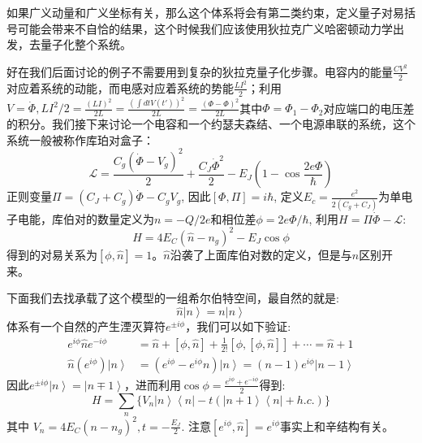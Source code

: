 \documentclass[supercite]{HustGraduPaper}
\newcommand{\bra}[1]{\left\langle #1 \right|}
\newcommand{\ket}[1]{\left| #1 \right\rangle}
\begin{document}
   	如果广义动量和广义坐标有关，那么这个体系将会有第二类约束，定义量子对易括号可能会带来不自恰的结果，这个时候我们应该使用狄拉克广义哈密顿动力学出发，去量子化整个系统。
   	
   	好在我们后面讨论的例子不需要用到复杂的狄拉克量子化步骤。电容内的能量$\frac{CV^2}{2}$对应着系统的动能，而电感对应着系统的势能$\frac{LI^2}{2}$；利用$V = \dot{\Phi}, LI^2/2 = \frac{(LI)^2}{2L} = \frac{(\int dt V(t'))^2}{2L} = \frac{(\Phi - \Phi)^2}{2L}$其中$\Phi = \Phi_1 - \Phi_2$对应端口的电压差的积分。我们接下来讨论一个电容和一个约瑟夫森结、一个电源串联的系统，这个系统一般被称作库珀对盒子：
   	\begin{equation}
   	\mathcal{L} = \frac{C_g (\dot \Phi - V_g)^2}{2} + \frac{C_J \dot \Phi^2}{2} - E_J(1-\cos\frac{2e\Phi}{\hbar})
   	\end{equation}
   	正则变量$\Pi = (C_J + C_g)\dot \Phi - C_gV_g$, 因此$[\Phi, \Pi] = i\hbar$, 定义$E_c = \frac{e^2}{2(C_g + C_J)}$为单电子电能，库伯对的数量定义为$n = -Q/2e$和相位差$\phi = 2e\Phi/\hbar$, 利用$H = \Pi \dot\Phi - \mathcal{L}$:
   	\begin{equation}
   	H = 4E_C(\hat n-n_g)^2 - E_J \cos\phi
   	\end{equation}
   	得到的对易关系为$[\phi,\hat n] = 1$。$\hat n$沿袭了上面库伯对数的定义，但是与$n$区别开来。
   	
   	下面我们去找承载了这个模型的一组希尔伯特空间，最自然的就是:
   	\begin{equation}
   	\hat n \ket{n} = n \ket{n}
   	\end{equation}
   	体系有一个自然的产生湮灭算符$e^{\pm i \phi}$，我们可以如下验证:
   	\begin{equation}
   	\begin{aligned}
   	e^{i\phi} \hat n e^{-i\phi} &= \hat n + [\phi,\hat n] + \frac{1}{2!}[\phi,[\phi,\hat n]] + \cdots = \hat n + 1\\
   	\hat{n}(e^{i\phi}) \ket{n} &=( e^{i\phi}-e^{i\phi} n )\ket{n} = (n-1)e^{i\phi} \ket{n-1}
   	\end{aligned}
   	\end{equation}
   	因此$e^{\pm i\phi} \ket{n} = \ket{n \mp 1}$，进而利用$\cos \phi = \frac{e^{i\phi} + e^{-i\phi}}{2}$得到:
   	\begin{equation}
   	H = \sum_n \{V_n \ket{n} \bra{n}- t (\ket{n+1}\bra{n} + h.c.)   \}
   	\end{equation}
   	其中 $V_n = 4E_C (n-n_g)^2, t = -\frac{E_J}{2}$. 注意$[e^{i\phi}, \hat n] = e^{i \phi}$事实上和辛结构有关。
   	
\end{document}
